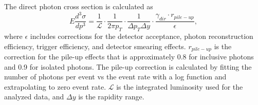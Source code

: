 \documentclass[twocolumn,letterpaper,aps,prl,longbibliography,superscriptaddress,floatfix]{revtex4-2}
\newcommand{\pizero}{\ensuremath{\pi^0}}
\begin{document}

The direct photon cross section is calculated as
\begin{equation} \label{eq:xsecex}
E\frac{d^3\sigma}{dp^3} = \frac{1}{\mathcal{L}} \cdot \frac{1}{2\pi p_T} \cdot \frac{1}{\Delta p_T \Delta y} \cdot \frac{\gamma_{dir} \cdot r_{pile-up}}{\epsilon},
\end{equation}
where $\epsilon$ includes corrections for the detector acceptance, photon reconstruction efficiency, trigger efficiency, and detector smearing effects. $r_{pile-up}$ is the correction for the pile-up effects that is approximately 0.8 for inclusive photons and 0.9 for isolated photons. The pile-up correction is calculated by fitting the number of photons per event vs the event rate with a log function and extrapolating to zero event rate. $\mathcal{L}$ is the integrated luminosity used for the analyzed data, and $\Delta y$ is the rapidity range. 
\end{document}
